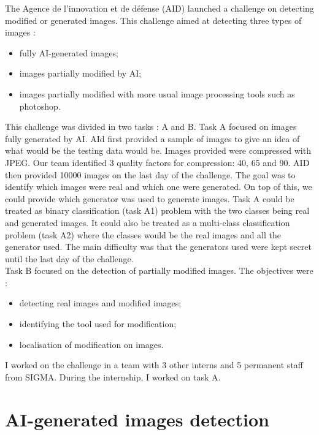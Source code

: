 \documentclass[12pt,a4paper]{article}
\begin{document}
The Agence de l'innovation et de défense (AID) launched a challenge on detecting modified or generated images. This challenge aimed at detecting three types of images :
\begin{itemize}
    \item fully AI-generated images;
    \item images partially modified by AI;
    \item images partially modified with more usual image processing tools such as photoshop.
\end{itemize}
This challenge was divided in two tasks : A and B. Task A focused on images fully generated by AI. AId first provided a sample of images to give an idea of what would be the testing data would be. Images provided were compressed with JPEG. Our team identified 3 quality factors for compression: 40, 65 and 90. AID then provided 10000 images on the last day of the challenge. The goal was to identify which images were real and which one were generated. On top of this, we could provide which generator was used to generate images. Task A could be treated as binary classification (task A1) problem with the two classes being real and generated images. It could also be treated as a multi-class classification problem (task A2) where the classes would be the real images and all the generator used. The main difficulty was that the generators used were kept secret until the last day of the challenge.\\
Task B focused on the detection of partially modified images. The objectives were :
\begin{itemize}
    \item detecting real images and modified images;
    \item identifying the tool used for modification;
    \item localisation of modification on images.
\end{itemize}

I worked on the challenge in a team with 3 other interns and 5 permanent staff from SIGMA. During the internship, I worked on task A.


\section{AI-generated images detection}
\end{document}
